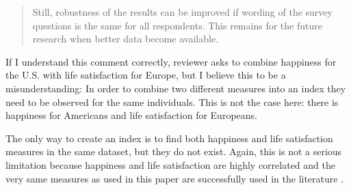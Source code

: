 \begin{quote}
 Still, robustness of the results can be improved if wording of the survey
 questions is the same for all respondents. This remains for the future research when better data
 become available.
\end{quote}



 If I understand this comment correctly, reviewer asks to combine happiness for the
U.S. with life satisfaction for Europe, but I believe this to be a misunderstanding: In order to
combine two different  measures into an index they need to be observed for the same
 individuals. This is not the case here: there is happiness for Americans and life satisfaction for Europeans.

\noindent The only way to create an index is to find both happiness and life satisfaction measures in the same
dataset, but they do not
exist. Again, this is not a serious limitation because happiness and life satisfaction
are highly correlated and the very same measures as used in this paper are successfully used in the
literature  \citep{alesina03, stevenson09w}.

